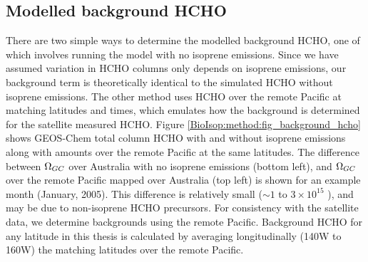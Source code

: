   \subsection{Modelled background HCHO}
    
    There are two simple ways to determine the modelled background HCHO, one of which involves running the model with no isoprene emissions. 
    Since we have assumed variation in HCHO columns only depends on isoprene emissions, our background term is theoretically identical to the simulated HCHO without isoprene emissions.
    The other method uses HCHO over the remote Pacific at matching latitudes and times, which emulates how the background is determined for the satellite measured HCHO.
    Figure \ref{BioIsop:method:fig_background_hcho} shows GEOS-Chem total column HCHO with and without isoprene emissions along with amounts over the remote Pacific at the same latitudes.
    The difference between $\Omega_{GC}$ over Australia with no isoprene emissions (bottom left), and $\Omega_{GC}$ over the remote Pacific mapped over Australia (top left) is shown for an example month (January, 2005).
    This difference is relatively small  ($\sim 1$ to $3 \times 10^{15}$ \moleccm), and may be due to non-isoprene HCHO precursors.
    For consistency with the satellite data, we determine backgrounds using the remote Pacific.
    Background HCHO for any latitude in this thesis is calculated by averaging longitudinally (140\degr W to 160\degr W) the matching latitudes over the remote Pacific.
    
    
    
